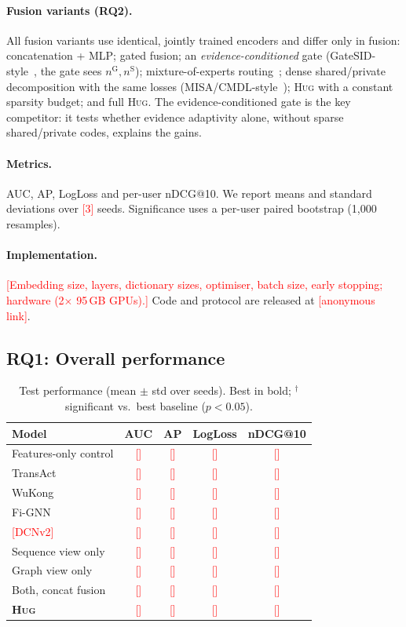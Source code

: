 \documentclass[sigconf,anonymous,review]{acmart}
\newcommand{\tbd}[1]{\textcolor{red}{[#1]}}
\newcommand{\method}{\textsc{Hug}}      %
\begin{document}
\paragraph{Fusion variants (RQ2).}
All fusion variants use identical, jointly trained encoders and differ only in
fusion: concatenation + MLP; gated fusion; an \emph{evidence-conditioned} gate
(GateSID-style~\cite{zhu2026gatesid}, the gate sees $n^{\mathrm{G}}, n^{\mathrm{S}}$);
mixture-of-experts routing~\cite{ma2018mmoe}; dense shared/private
decomposition with the same losses (MISA/CMDL-style~\cite{hazarika2020misa,lin2025cmdl});
\method{} with a constant sparsity budget; and full \method{}. The
evidence-conditioned gate is the key competitor: it tests whether evidence
adaptivity alone, without sparse shared/private codes, explains the gains.

\paragraph{Metrics.}
AUC, AP, LogLoss and per-user nDCG@10. We report means and standard deviations
over \tbd{3} seeds. Significance uses a per-user paired bootstrap
(1{,}000 resamples).

\paragraph{Implementation.}
\tbd{Embedding size, layers, dictionary sizes, optimiser, batch size, early
stopping; hardware (2$\times$ 95\,GB GPUs).} Code and protocol are released
at \tbd{anonymous link}.

\subsection{RQ1: Overall performance}

\begin{table}[t]
  \caption{Test performance (mean $\pm$ std over seeds). Best in bold;
  $^{\dagger}$ significant vs.\ best baseline ($p<0.05$).}
  \label{tab:main}
  \small
  \setlength{\tabcolsep}{4pt}
  \begin{tabular}{lcccc}
    \toprule
    Model & AUC & AP & LogLoss & nDCG@10 \\
    \midrule
    Features-only control & \tbd{} & \tbd{} & \tbd{} & \tbd{} \\
    TransAct      & \tbd{} & \tbd{} & \tbd{} & \tbd{} \\
    WuKong        & \tbd{} & \tbd{} & \tbd{} & \tbd{} \\
    Fi-GNN        & \tbd{} & \tbd{} & \tbd{} & \tbd{} \\
    \tbd{DCNv2}   & \tbd{} & \tbd{} & \tbd{} & \tbd{} \\
    \midrule
    Sequence view only & \tbd{} & \tbd{} & \tbd{} & \tbd{} \\
    Graph view only    & \tbd{} & \tbd{} & \tbd{} & \tbd{} \\
    Both, concat fusion & \tbd{} & \tbd{} & \tbd{} & \tbd{} \\
    \textbf{\method{}} & \tbd{} & \tbd{} & \tbd{} & \tbd{} \\
    \bottomrule
  \end{tabular}
\end{table}
\end{document}
